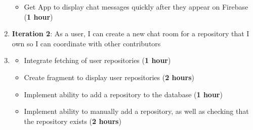 \documentclass{report}
\begin{document}
\begin{enumerate}
\begin{itemize}
        \item Get App to display chat messages quickly after they appear on Firebase (\textbf{1 hour})
    \end{itemize}
    \item \textbf{Iteration 2}: As a user, I can create a new chat room for a repository that I own so I can coordinate with other contributors
    \item[] \begin{itemize}
        \item Integrate fetching of user repositories (\textbf{1 hour})
        \item Create fragment to display user repositories (\textbf{2 hours})
        \item Implement ability to add a repository to the database (\textbf{1 hour})
        \item Implement ability to manually add a repository, as well as checking that the repository exists (\textbf{2 hours})
    \end{itemize}


\end{enumerate}
\end{document}
